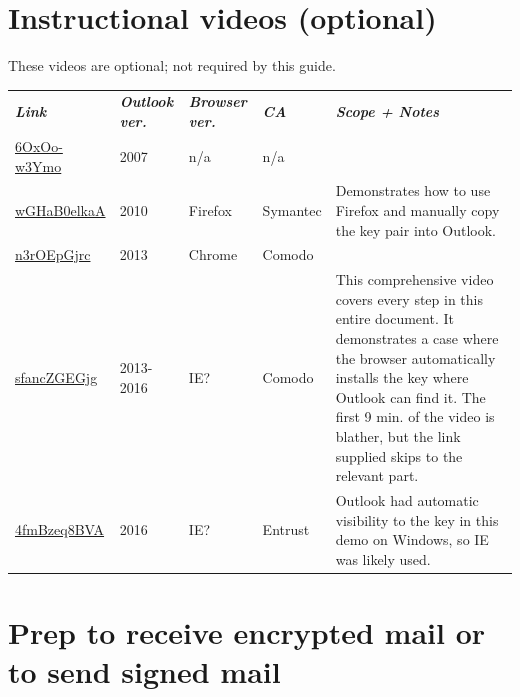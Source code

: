 \documentclass[pdftex,12pt,titlepage=false]{scrartcl}
\begin{document}
\section{Instructional videos (optional)}
These videos are optional; not required by this guide.\\[0.5em]

\begin{tabular}{llllp{}}
  \slshape\textbf{Link} & \slshape\textbf{Outlook ver.} & \slshape\textbf{Browser ver.} & \slshape\textbf{CA} & \slshape\textbf{Scope + Notes}\\
  \href{https://www.youtube.com/watch?v=6OxOo-w3Ymo}{6OxOo-w3Ymo}
  & 2007 & n/a & n/a &\\
  \href{https://www.youtube.com/watch?v=wGHaB0elkaA}{wGHaB0elkaA}
  & 2010 & Firefox & Symantec & Demonstrates how to use Firefox and manually copy the key pair into Outlook.\\
  \href{https://www.youtube.com/watch?v=n3rOEpGjrc}{n3rOEpGjrc}
  & 2013 & Chrome & Comodo & \\
  \href{https://www.youtube.com/watch?v=sfancZGEGjg\&start=535}{sfancZGEGjg}
  & 2013-2016 & IE? & Comodo & This comprehensive video covers every step in this entire document.  It demonstrates a case where the browser automatically installs the key where Outlook can find it.  The first 9 min. of the video is blather, but the link supplied skips to the relevant part.\\
  \href{https://www.youtube.com/watch?v=4fmBzeq8BVA}{4fmBzeq8BVA}
  & 2016 & IE? & Entrust & Outlook had automatic visibility to the key in this demo on Windows, so IE was likely used.\\
\end{tabular}

\section{Prep to receive encrypted mail or to send signed mail}
\end{document}
